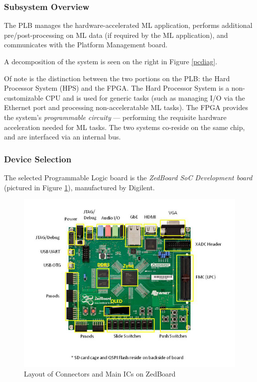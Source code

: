 \subsubsection{Subsystem Overview}
 The PLB manages the hardware-accelerated ML application, performs additional pre/post-processing on ML data (if required by the ML application), and communicates with the Platform Management board.

A decomposition of the system is seen on the right in Figure \ref{pcdiag}.

Of note is the distinction between the two portions on the PLB: the Hard Processor System (HPS) and the FPGA. The Hard Processor System is a non-customizable CPU and is used for generic tasks (such as managing I/O via the Ethernet port and processing non-acceleratable ML tasks). The FPGA provides the system's \textit{programmable circuity} --- performing the requisite hardware acceleration needed for ML tasks. The two systems co-reside on the same chip, and are interfaced via an internal bus.

\subsubsection{Device Selection}
The selected Programmable Logic board is the \textit{ZedBoard SoC Development board} (pictured in Figure \ref{zedboard}), manufactured by Digilent. 

\begin{figure}\label{zedboard}
\centering
\includegraphics[width=12.5cm]{img/zedboard_functional_overview.jpg}
\caption{Layout of Connectors and Main ICs on ZedBoard}
\end{figure}

